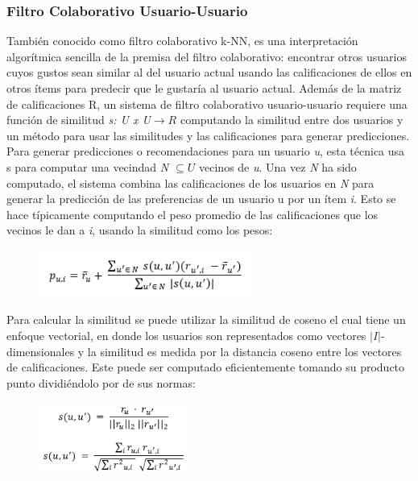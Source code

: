 \documentclass[12pt,letterpaper,openany]{book}
\begin{document}
\subsubsection{Filtro Colaborativo Usuario-Usuario \cite{23}}
También conocido como filtro colaborativo k-NN, es una interpretación algorítmica sencilla de la premisa del filtro colaborativo: encontrar otros usuarios cuyos gustos sean similar al del usuario actual usando las calificaciones de ellos en otros ítems para predecir que le gustaría al usuario actual.
\vspace{5mm}\newline
Además de la matriz de calificaciones R, un sistema de filtro colaborativo usuario-usuario requiere una función de similitud \textit{s: U x U$\rightarrow{R}$} computando la similitud entre dos usuarios y un método para usar las similitudes y las calificaciones para generar predicciones.
\vspace{5mm}\newline
Para generar predicciones o recomendaciones para un usuario \textit{u}, esta técnica usa s para computar una vecindad \textit{N $\subseteq{U}$} vecinos de \textit{u}. Una vez \textit{N} ha sido computado, el sistema combina las calificaciones de los usuarios en \textit{N} para generar la predicción de las preferencias de un usuario u por un ítem \textit{i}. Esto se hace típicamente computando el peso promedio de las calificaciones que los vecinos le dan a \textit{i}, usando la similitud como los pesos:

\begin{figure}[H]
\begin{center}
\includegraphics[width=7cm]{./imagenes/formulas/form1}
\end{center}
\end{figure}

Para calcular la similitud se puede utilizar la similitud de coseno el cual tiene un enfoque vectorial, en donde los usuarios son representados como vectores $\vert{I}\vert$-dimensionales y la similitud es medida por la distancia coseno entre los vectores de calificaciones. Este puede ser computado eficientemente tomando su producto punto dividiéndolo por de sus normas:

\begin{figure}[H]
\begin{center}
\includegraphics[width=5cm]{./imagenes/formulas/form2}
\end{center}
\end{figure}
\end{document}
